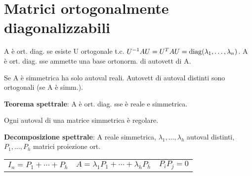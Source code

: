 \section{Matrici ortogonalmente diagonalizzabili}

A è ort. diag. se esiste U ortogonale t.c. $U^{-1}AU = U^TAU = \mathrm{diag}(\lambda_1, \dots, \lambda_n)$.
A è ort. diag. sse ammette una base ortonorm. di autovett di A.

Se A è simmetrica ha solo autoval reali. Autovett di autoval distinti sono ortogonali (se A è simm.).

\textbf{Teorema spettrale}: A è ort. diag. sse è reale e simmetrica.

Ogni autoval di una matrice simmetrica è regolare.

\textbf{Decomposizione spettrale}: A reale simmetrica, $\lambda_1, \dots, \lambda_h$ autoval distinti, $P_1, \dots, P_h$ matrici proiezione ort.
\begin{tabular}{lll}
	$I_n = P_1 + \cdots + P_h$ & $A = \lambda_1P_1 + \cdots + \lambda_hP_h$ & $P_iP_j = 0$
\end{tabular}
